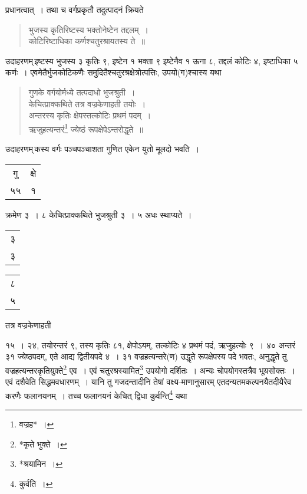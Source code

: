 \documentclass[10pt, openany]{book}
\begin{document}
{{{{{{{{{{{{{{{{{\newpage

{प्रधानत्वात्~। तथा च वर्गप्रकृतौ तदुत्पादनं क्रियते\textemdash}

\begin{quote}

{\qt भुजस्य कृतिरिष्टस्य भक्तोनेष्टेन तद्दलम्~। \\
 कोटिरिष्टाधिका कर्णश्चतुरश्रायतस्य ते~॥}\end{quote}

{उदाहरणम्\textendash \,इष्टस्य भुजस्य ३ कृतिः ९, इष्टेन १ भक्ता ९ इष्टेनैव १ ऊना ८,}
{तद्दलं कोटिः ४, इष्टाधिका ५ कर्णः~। एवमेतैर्भुजकोटिकणैः
समुदितैश्चतुरश्रक्षेत्रोत्पत्तिः,}
{उपयो(ग)श्चास्य यथा}

\begin{quote}
    
{\qt  गुणके वर्गयोर्मध्ये तत्पदाधो भुजश्रुती~। \\
 केचित्प्राक्कथिते तत्र वज्रकेणाहती तयोः~। \\
 अन्तरस्य कृतिः क्षेपस्तत्कोटिः प्रथमं पदम्~। \\
 ऋजुहत्यन्तरं\renewcommand{\thefootnote}{१}\footnote{वज्रह*~।} ज्येष्ठं रूपक्षेपेऽन्तरोद्धृते~॥}\end{quote}

{उदाहरणम्\textendash \,कस्य वर्गः पञ्चपञ्चाशता गुणित एकेन युतो मूलदो भवति~।}
\begin{center}


  \begin{tabular}{|c|c|} गु & क्षे\\ ५५ &१\\\hline \end{tabular}

 \end{center}

{क्रमेण ३~। ८  केचित्प्राक्कथिते भुजश्रुती ३~। ५ अधः स्थाप्यते~। \begin{tabular}{|c|}३\\३\\\hline \end{tabular}\begin{tabular}{c|}८\\५\\\hline \end{tabular} तत्र वज्रकेणाहती}
{१५~। २४, तयोरन्तरं ९, तस्य कृतिः ८१, क्षेपोऽयम्, तत्कोटिः ४ प्रथमं पदं,
ऋजुहत्योः}
{९~। ४० अन्तरं ३१ ज्येष्ठपदम्, एते आद्य द्वितीयपदे ४~। ३१ वज्रहत्यन्तरे(ण)
उद्धृते रूपक्षेपस्य}
{पदे भवतः, अनुद्धृते तु वज्रहत्यन्तरकृतियुक्ते\renewcommand{\thefootnote}{३}\footnote{*कृते भुक्ते~।} एव~। एवं
चतुरश्रस्यामित\renewcommand{\thefootnote}{४}\footnote{*श्रयामिन~।} उपयोगो दर्शितः~।}
{अन्यः चोपयोगस्तत्रैव भूयसोक्तः~। एवं दशैवेति सिद्धमवधारणम्~। यानि तु
गजदन्तादीनि}
{तेषां वक्ष्य-माणानुसारम् एतदन्यतमकल्पनयैतदीयैरेव करणैः फलानयनम्~। तच्च
फलानयनं}
{केचित् द्विधा कुर्वन्ति\renewcommand{\thefootnote}{५}\footnote{कुर्वति~।} यथा\textemdash}

}}}}}}}}}}}}}}}}}
\end{document}
